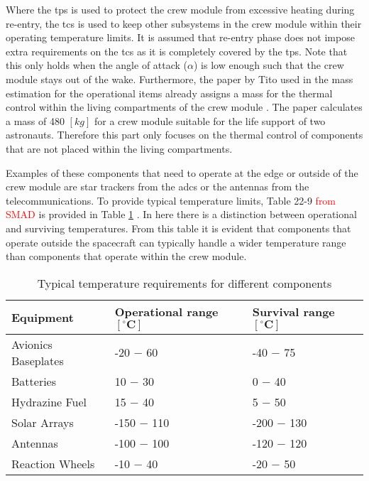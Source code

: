 Where the \acrfull{tps} is used to protect the crew module from excessive heating during re-entry, the \acrfull{tcs} is used to keep other subsystems in the crew module within their operating temperature limits. It is assumed that re-entry phase does not impose extra requirements on the \gls{tcs} as it is completely covered by the \gls{tps}. Note that this only holds when the angle of attack ($\alpha$) is low enough such that the crew module stays out of the wake. Furthermore, the paper by Tito used in the mass estimation for the operational items already assigns a mass for the thermal control within the living compartments of the crew module \cite{Tito2013}. The paper calculates a mass of 480 $[kg]$ for a crew module suitable for the life support of two astronauts. Therefore this part only focuses on the thermal control of components that are not placed within the living compartments.

Examples of these components that need to operate at the edge or outside of the crew module are star trackers from the \gls{adcs} or the antennas from the telecommunications. To provide typical temperature limits, Table 22-9 \textcolor{red}{from SMAD} is provided in Table \ref{tab:cmtherm} \cite{Wertz2011}. In here there is a distinction between operational and surviving temperatures. From this table it is evident that components that operate outside the spacecraft can typically handle a wider temperature range than components that operate within the crew module.

\begin{table}[h]
	\centering
	\caption{Typical temperature requirements for different components}
	\begin{tabular}{|l||l|l|}
		\hline
		\textbf{Equipment} & \textbf{Operational range $\mathbf{[^{\circ}C]}$} & \textbf{Survival range $\mathbf{[^{\circ}C]}$}\\ \hline \hline
		Avionics Baseplates & -20 $-$ 60 & -40 $-$ 75 \\
		Batteries & 10 $-$ 30 & 0 $-$ 40 \\
		Hydrazine Fuel & 15 $-$ 40 & 5 $-$ 50 \\
		Solar Arrays & -150 $-$ 110 & -200 $-$ 130 \\
		Antennas & -100 $-$ 100 & -120 $-$ 120 \\
		Reaction Wheels & -10 $-$ 40 & -20 $-$ 50 \\
		\hline
	\end{tabular}
	\label{tab:cmtherm}
\end{table}

